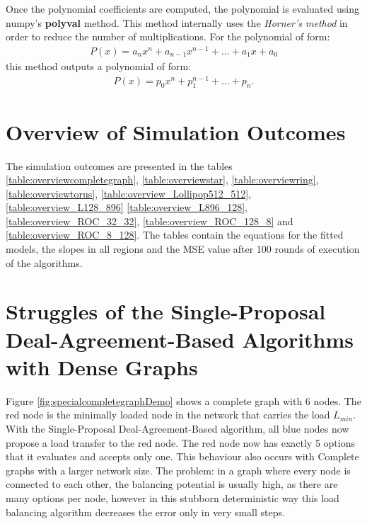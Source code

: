 Once the polynomial coefficients are computed, the polynomial is evaluated using numpy's \textbf{polyval} method. This method internally uses the \textit{Horner's method} in order to reduce the number of multiplications. For the polynomial of form:
\begin{align}
    P(x) = a_{n}x^{n}+a_{n-1}x^{n-1}+ \dots + a_{1}x+a_{0}
\end{align}
this method outputs a polynomial of form:
\begin{align}
    P(x)=p_{0}x^{n}+p_{1}^{n-1}+\dots + p_{n}.
\end{align}
\cite{wolfram_horner}

\section{Overview of Simulation Outcomes}\label{sec:overviewSimOutcomes}
The simulation outcomes are presented in the tables \ref{table:overviewcompletegraph}, \ref{table:overviewstar}, \ref{table:overviewring}, \ref{table:overviewtorus}, \ref{table:overview_Lollipop512_512}, \ref{table:overview_L128_896} \ref{table:overview_L896_128}, \ref{table:overview_ROC_32_32}, \ref{table:overview_ROC_128_8} and \ref{table:overview_ROC_8_128}. The tables contain the equations for the fitted models, the slopes in all regions and the MSE value after 100 rounds of execution of the algorithms.













\section{Struggles of the Single-Proposal Deal-Agreement-Based Algorithms with Dense Graphs}\label{sec:struggleDAB}
Figure \ref{fig:specialcompletegraphDemo} shows a complete graph with 6 nodes. The red node is the minimally loaded node in the network that carries the load $L_{min}$. With the Single-Proposal Deal-Agreement-Based algorithm, all blue nodes now propose a load transfer to the red node. The red node now has exactly 5 options that it evaluates and accepts only one. This behaviour also occurs with Complete graphs with a larger network size. The problem: in a graph where every node is connected to each other, the balancing potential is usually high, as there are many options per node, however in this stubborn deterministic way this load balancing algorithm decreases the error only in very small steps.

